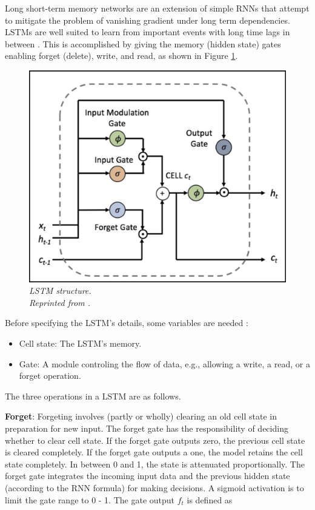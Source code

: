 Long short-term memory networks are an extension of simple RNNs that attempt to mitigate the problem of vanishing gradient under long term dependencies. LSTMs are well suited to learn from important events with long time lags in between \cite{donges_2019,olah_2015}. This is accomplished by giving the memory (hidden state) gates enabling forget (delete), write, and read, as shown in Figure \ref{fig:LSTM}.

\begin{figure}[H]
  \centering
  \caption[LSTM structure.]{\emph{LSTM structure. \\ Reprinted from  \citeauthor{sirinart_tangruamsub_2017} \citeyear{sirinart_tangruamsub_2017}.}}\label{fig:LSTM}
  \includegraphics[scale = 0.3]{figures/LSTM.jpg}
\end{figure}


Before specifying the LSTM's details, some variables are needed \cite{sirinart_tangruamsub_2017}:
\begin{itemize}
  \item Cell state: The LSTM's memory.
  \item Gate: A module controling the flow of data, e.g., allowing a write, a read, or a forget operation.
\end{itemize}

The three operations in a LSTM are as follows.


\textbf{Forget}: Forgeting involves (partly or wholly) clearing an old cell state in preparation for new input. The forget gate has the responsibility of deciding whether to clear cell state. If the forget gate outputs zero, the previous cell state is cleared completely. If the forget gate outputs a one, the model retains the cell state completely. In between 0 and 1, the state is attenuated proportionally. The forget gate integrates the incoming input data and the previous hidden state (according to the RNN formula) for making decisions. A sigmoid activation is to limit the gate range to 0 - 1. The gate output $f_t$ is defined as

